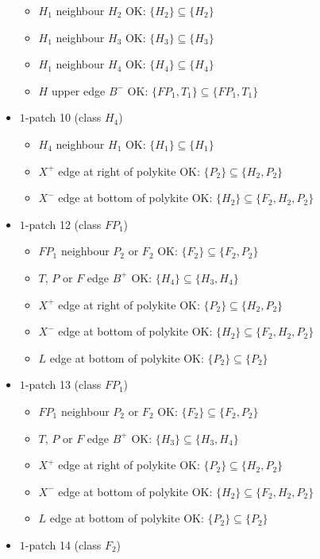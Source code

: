 \begin{itemize}
\begin{itemize}
\item $H_1$ neighbour $H_2$ OK: $\{H_2\} \subseteq \{H_2\}$
\item $H_1$ neighbour $H_3$ OK: $\{H_3\} \subseteq \{H_3\}$
\item $H_1$ neighbour $H_4$ OK: $\{H_4\} \subseteq \{H_4\}$
\item $H$ upper edge $B^-$ OK: $\{FP_1, T_1\} \subseteq \{FP_1, T_1\}$
\end{itemize}
\item $1$-patch 10 (class $H_4$)
\begin{itemize}
\item $H_4$ neighbour $H_1$ OK: $\{H_1\} \subseteq \{H_1\}$
\item $X^+$ edge at right of polykite OK: $\{P_2\} \subseteq \{H_2, P_2\}$
\item $X^-$ edge at bottom of polykite OK: $\{H_2\} \subseteq \{F_2, H_2, P_2\}$
\end{itemize}
\item $1$-patch 12 (class $FP_1$)
\begin{itemize}
\item $FP_1$ neighbour $P_2$ or $F_2$ OK: $\{F_2\} \subseteq \{F_2, P_2\}$
\item $T$, $P$ or $F$ edge $B^+$ OK: $\{H_4\} \subseteq \{H_3, H_4\}$
\item $X^+$ edge at right of polykite OK: $\{P_2\} \subseteq \{H_2, P_2\}$
\item $X^-$ edge at bottom of polykite OK: $\{H_2\} \subseteq \{F_2, H_2, P_2\}$
\item $L$ edge at bottom of polykite OK: $\{P_2\} \subseteq \{P_2\}$
\end{itemize}
\item $1$-patch 13 (class $FP_1$)
\begin{itemize}
\item $FP_1$ neighbour $P_2$ or $F_2$ OK: $\{F_2\} \subseteq \{F_2, P_2\}$
\item $T$, $P$ or $F$ edge $B^+$ OK: $\{H_3\} \subseteq \{H_3, H_4\}$
\item $X^+$ edge at right of polykite OK: $\{P_2\} \subseteq \{H_2, P_2\}$
\item $X^-$ edge at bottom of polykite OK: $\{H_2\} \subseteq \{F_2, H_2, P_2\}$
\item $L$ edge at bottom of polykite OK: $\{P_2\} \subseteq \{P_2\}$
\end{itemize}
\item $1$-patch 14 (class $F_2$)
\begin{itemize}

\end{itemize}
\end{itemize}
